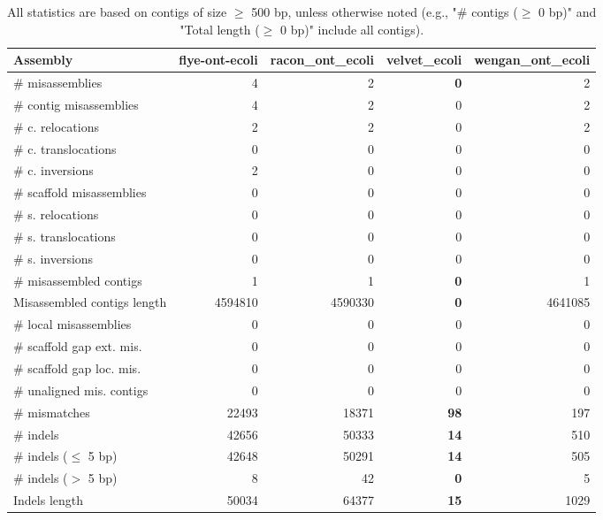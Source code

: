 \documentclass[12pt,a4paper]{article}
\begin{document}
\begin{table}[ht]
\begin{center}
\caption{All statistics are based on contigs of size $\geq$ 500 bp, unless otherwise noted (e.g., "\# contigs ($\geq$ 0 bp)" and "Total length ($\geq$ 0 bp)" include all contigs).}
\begin{tabular}{|l*{4}{|r}|}
\hline
Assembly & flye-ont-ecoli & racon\_ont\_ecoli & velvet\_ecoli & wengan\_ont\_ecoli \\ \hline
\# misassemblies & 4 & 2 & {\bf 0} & 2 \\ \hline
\hspace{2mm}\# contig misassemblies & 4 & 2 & 0 & 2 \\ \hline
\hspace{5mm}\# c. relocations & 2 & 2 & 0 & 2 \\ \hline
\hspace{5mm}\# c. translocations & 0 & 0 & 0 & 0 \\ \hline
\hspace{5mm}\# c. inversions & 2 & 0 & 0 & 0 \\ \hline
\hspace{2mm}\# scaffold misassemblies & 0 & 0 & 0 & 0 \\ \hline
\hspace{5mm}\# s. relocations & 0 & 0 & 0 & 0 \\ \hline
\hspace{5mm}\# s. translocations & 0 & 0 & 0 & 0 \\ \hline
\hspace{5mm}\# s. inversions & 0 & 0 & 0 & 0 \\ \hline
\# misassembled contigs & 1 & 1 & {\bf 0} & 1 \\ \hline
Misassembled contigs length & 4594810 & 4590330 & {\bf 0} & 4641085 \\ \hline
\# local misassemblies & 0 & 0 & 0 & 0 \\ \hline
\# scaffold gap ext. mis. & 0 & 0 & 0 & 0 \\ \hline
\# scaffold gap loc. mis. & 0 & 0 & 0 & 0 \\ \hline
\# unaligned mis. contigs & 0 & 0 & 0 & 0 \\ \hline
\# mismatches & 22493 & 18371 & {\bf 98} & 197 \\ \hline
\# indels & 42656 & 50333 & {\bf 14} & 510 \\ \hline
\hspace{5mm}\# indels ($\leq$ 5 bp) & 42648 & 50291 & {\bf 14} & 505 \\ \hline
\hspace{5mm}\# indels ($>$ 5 bp) & 8 & 42 & {\bf 0} & 5 \\ \hline
Indels length & 50034 & 64377 & {\bf 15} & 1029 \\ \hline
\end{tabular}
\end{center}
\end{table}
\end{document}
